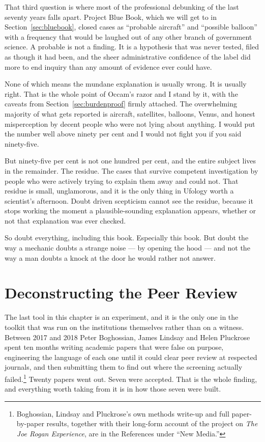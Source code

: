 That third question is where most of the professional debunking of the last seventy
years falls apart. Project Blue Book, which we will get to in
Section~\ref{sec:bluebook}, closed cases as ``probable aircraft'' and ``possible
balloon'' with a frequency that would be laughed out of any other branch of
government science. A probable is not a finding. It is a hypothesis that was never
tested, filed as though it had been, and the sheer administrative confidence of the
label did more to end inquiry than any amount of evidence ever could have.

None of which means the mundane explanation is usually wrong. It is usually right.
That is the whole point of Occam's razor and I stand by it, with the caveats from
Section~\ref{sec:burdenproof} firmly attached. The overwhelming majority of what gets reported is
aircraft, satellites, balloons, Venus, and honest misperception by decent people who
were not lying about anything. I would put the number well above ninety per cent and
I would not fight you if you said ninety-five.

But ninety-five per cent is not one hundred per cent, and the entire subject lives in
the remainder. The residue. The cases that survive competent investigation by people
who were actively trying to explain them away and could not. That residue is small,
unglamorous, and it is the only thing in Ufology worth a scientist's afternoon.
Doubt driven scepticism cannot see the residue, because it stops working the moment a
plausible-sounding explanation appears, whether or not that explanation was ever
checked.

So doubt everything, including this book. Especially this book. But doubt the way a
mechanic doubts a strange noise --- by opening the hood --- and not the way a man
doubts a knock at the door he would rather not answer.

\section{Deconstructing the Peer Review}\label{sec:deconstructingpeerreview}

The last tool in this chapter is an experiment, and it is the only one in the toolkit that
was run on the institutions themselves rather than on a witness. Between 2017 and 2018
Peter Boghossian, James Lindsay and Helen Pluckrose spent ten months writing academic
papers that were false on purpose, engineering the language of each one until it could
clear peer review at respected journals, and then submitting them to find out where the
screening actually failed.\footnote{Boghossian, Lindsay and Pluckrose's own methods write-up
and full paper-by-paper results, together with their long-form account of the project on
\emph{The Joe Rogan Experience}, are in the References under ``New Media.''} Twenty papers
went out. Seven were accepted. That is the whole finding, and everything worth taking from
it is in how those seven were built.

